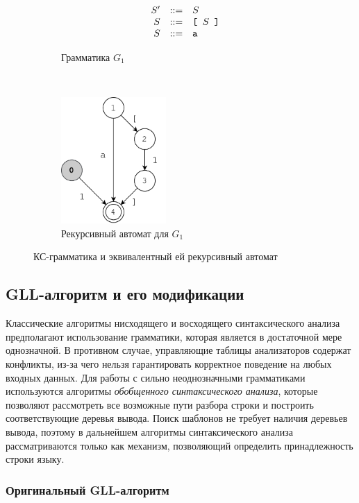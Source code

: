 \begin{figure}[h]
	\centering
	\begin{subfigure}[b]{0.45\textwidth}
		\centering
		$$
		\begin{array}{crcl}
		&S' & ::= & S \\
		&S  & ::= & \texttt{[ } S \texttt{ ]}\\
		&S  & ::= & \mbox{\texttt{a}}
		\end{array}
		$$
		\caption{Грамматика $G_1$}
	\end{subfigure}
	~
	\begin{subfigure}[b]{0.45\textwidth}
		\centering
		\includegraphics[width=4cm]{../diploma/pictures/ra_example.pdf}
		\caption{Рекурсивный автомат для $G_1$}
	\end{subfigure}
	\caption{КС-грамматика и эквивалентный ей рекурсивный автомат}
	\label{fig:ra_ex}
\end{figure}

\subsection{GLL-алгоритм и его модификации}

Классические алгоритмы нисходящего и восходящего синтаксического анализа предполагают использование грамматики, которая является в достаточной мере однозначной. 
В противном случае, управляющие таблицы анализаторов содержат конфликты, из-за чего нельзя гарантировать корректное поведение на любых входных данных. 
Для работы с сильно неоднозначными грамматиками используются алгоритмы \textit{обобщенного синтаксического анализа}, которые позволяют рассмотреть все возможные пути разбора строки и построить соответствующие деревья вывода.
Поиск шаблонов не требует наличия деревьев вывода, поэтому в дальнейшем алгоритмы синтаксического анализа рассматриваются только как механизм, позволяющий определить принадлежность строки языку.

\subsubsection{Оригинальный GLL-алгоритм}

